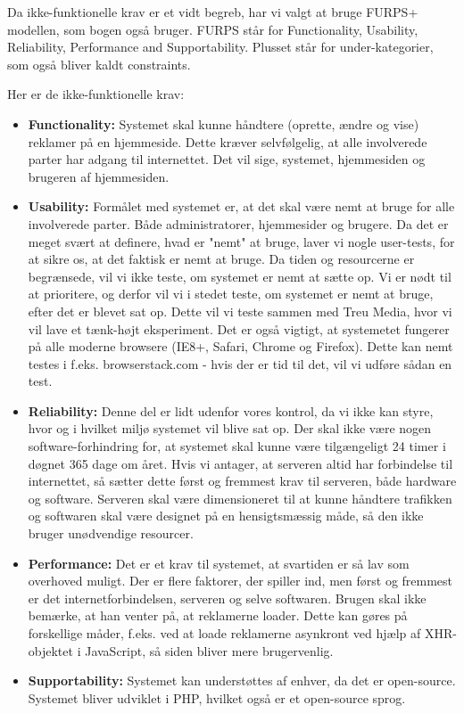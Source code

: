 \documentclass[a4paper,12pt]{article}
\begin{document}
Da ikke-funktionelle krav er et vidt begreb, har vi valgt at bruge FURPS+ modellen, som bogen også bruger. FURPS står for Functionality, Usability, Reliability, Performance and Supportability. Plusset står for under-kategorier, som også bliver kaldt constraints.

Her er de ikke-funktionelle krav:
\begin{itemize}
	\item \textbf{Functionality:} Systemet skal kunne håndtere (oprette, ændre og vise) reklamer på en hjemmeside. Dette kræver selvfølgelig, at alle involverede parter har adgang til internettet. Det vil sige, systemet, hjemmesiden og brugeren af hjemmesiden.
	\item \textbf{Usability:} Formålet med systemet er, at det skal være nemt at bruge for alle involverede parter. Både administratorer, hjemmesider og brugere. Da det er meget svært at definere, hvad er "nemt" at bruge, laver vi nogle user-tests, for at sikre os, at det faktisk er nemt at bruge. Da tiden og resourcerne er begrænsede, vil vi ikke teste, om systemet er nemt at sætte op. Vi er nødt til at prioritere, og derfor vil vi i stedet teste, om systemet er nemt at bruge, efter det er blevet sat op. Dette vil vi teste sammen med Treu Media, hvor vi vil lave et tænk-højt eksperiment. Det er også vigtigt, at systemetet fungerer på alle moderne browsere (IE8+, Safari, Chrome og Firefox). Dette kan nemt testes i f.eks. browserstack.com - hvis der er tid til det, vil vi udføre sådan en test.
	\item \textbf{Reliability:} Denne del er lidt udenfor vores kontrol, da vi ikke kan styre, hvor og i hvilket miljø systemet vil blive sat op. Der skal ikke være nogen software-forhindring for, at systemet skal kunne være tilgængeligt 24 timer i døgnet 365 dage om året. Hvis vi antager, at serveren altid har forbindelse til internettet, så sætter dette først og fremmest krav til serveren, både hardware og software. Serveren skal være dimensioneret til at kunne håndtere trafikken og softwaren skal være designet på en hensigtsmæssig måde, så den ikke bruger unødvendige resourcer.
	\item \textbf{Performance:} Det er et krav til systemet, at svartiden er så lav som overhoved muligt. Der er flere faktorer, der spiller ind, men først og fremmest er det internetforbindelsen, serveren og selve softwaren. Brugen skal ikke bemærke, at han venter på, at reklamerne loader. Dette kan gøres på forskellige måder, f.eks. ved at loade reklamerne asynkront ved hjælp af XHR-objektet i JavaScript, så siden bliver mere brugervenlig.
	\item \textbf{Supportability:} Systemet kan understøttes af enhver, da det er open-source. Systemet bliver udviklet i PHP, hvilket også er et open-source sprog.
\end{itemize}
\end{document}
